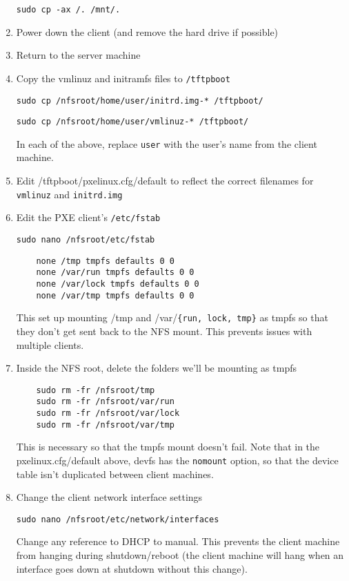 \documentclass{article}
\begin{document}
\begin{flushleft}
\begin{enumerate}
  \verb|sudo cp -ax /. /mnt/.|

  \item Power down the client (and remove the hard drive if possible)
  \item Return to the server machine
  \item Copy the vmlinuz and initramfs files to \verb|/tftpboot|

  \verb|sudo cp /nfsroot/home/user/initrd.img-* /tftpboot/|

  \verb|sudo cp /nfsroot/home/user/vmlinuz-* /tftpboot/|

  In each of the above, replace \verb|user| with the user's name from the client machine.

  \item Edit /tftpboot/pxelinux.cfg/default to reflect the correct filenames for \verb|vmlinuz| and \verb|initrd.img|

  \item Edit the PXE client's \verb|/etc/fstab|

  \verb|sudo nano /nfsroot/etc/fstab|

  \begin{verbatim}
    none /tmp tmpfs defaults 0 0
    none /var/run tmpfs defaults 0 0
    none /var/lock tmpfs defaults 0 0
    none /var/tmp tmpfs defaults 0 0
  \end{verbatim}

   This set up mounting /tmp and /var/\verb|{run, lock, tmp}| as tmpfs so that they don't get sent back to the NFS mount.  This prevents issues with multiple clients.

  \item Inside the NFS root, delete the folders we'll be mounting as tmpfs

  \begin{verbatim}
    sudo rm -fr /nfsroot/tmp
    sudo rm -fr /nfsroot/var/run
    sudo rm -fr /nfsroot/var/lock
    sudo rm -fr /nfsroot/var/tmp
  \end{verbatim}

  This is necessary so that the tmpfs mount doesn't fail.  Note that in the pxelinux.cfg/default above, devfs has the \verb|nomount| option, so that the device table isn't duplicated between client machines.

  \item Change the client network interface settings

  \verb|sudo nano /nfsroot/etc/network/interfaces|

  Change any reference to DHCP to manual.  This prevents the client machine from hanging during shutdown/reboot (the client machine will hang when an interface goes down at shutdown without this change).


\end{enumerate}
\end{flushleft}
\end{document}
